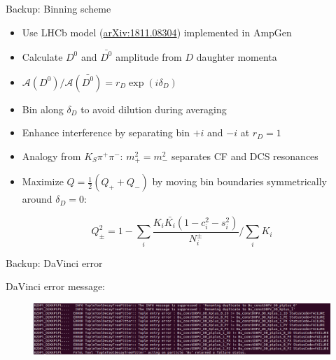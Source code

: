 \documentclass{beamer}
\begin{document}
\begin{frame}{Backup: Binning scheme}
  \begin{itemize}
    \setlength\itemsep{1.2em}
    \item{Use LHCb model (\href{https://arxiv.org/abs/1811.08304}{arXiv:1811.08304}) implemented in AmpGen}
    \item{Calculate $D^0$ and $\bar{D^0}$ amplitude from $D$ daughter momenta}
    \item{$\mathcal{A}(D^0)/\mathcal{A}(\bar{D^0}) = r_D\exp(i\delta_D)$}
    \item{Bin along $\delta_D$ to avoid dilution during averaging}
    \item{Enhance interference by separating bin $+i$ and $-i$ at $r_D = 1$}
    \item{Analogy from $K_S\pi^+\pi^-$: $m^2_+ = m^2_-$ separates CF and DCS resonances}
    \item{Maximize $Q = \frac{1}{2}(Q_+ + Q_-)$ by moving bin boundaries symmetrically around $\delta_D = 0$:}
  \end{itemize}
  \begin{equation*}
    Q_\pm^2 = 1 - \sum_i\frac{K_i\bar{K_i}(1 - c_i^2 - s_i^2)}{N^\pm_i}\Big/\sum_iK_i
  \end{equation*}
\end{frame}

\begin{frame}{Backup: DaVinci error}
  \begin{center}
    DaVinci error message:
  \end{center}
  \begin{figure}
    \includegraphics[width = 1\textwidth]{DaVinciError.png}
  \end{figure}
\end{frame}
\end{document}

